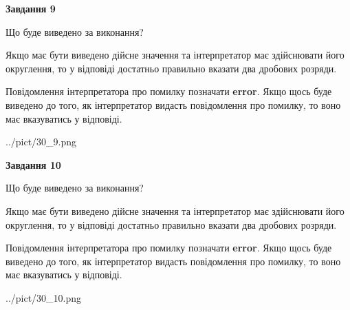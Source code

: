 \documentclass[12pt, ukrainian]{article}
\begin{document}
{\begin {Large}
{\begin {center}\textbf{Завдання 9}\end {center}}\par
Що буде виведено за виконання? \par

Якщо має бути виведено дійсне значення та інтерпретатор має здійснювати його округлення, 
то у відповіді достатньо правильно вказати два дробових розряди.

Повідомлення інтерпретатора про помилку позначати \textbf{error}.
Якщо щось буде виведено до того, як інтерпретатор видасть повідомлення про помилку, 
то воно має вказуватись у відповіді. \par

\begin{center}
	{../pict/30_9.png}
\end{center}
\newpage

{\begin {center}\textbf{Завдання 10}\end {center}}\par
Що буде виведено за виконання? \par

Якщо має бути виведено дійсне значення та інтерпретатор має здійснювати його округлення, 
то у відповіді достатньо правильно вказати два дробових розряди.

Повідомлення інтерпретатора про помилку позначати \textbf{error}.
Якщо щось буде виведено до того, як інтерпретатор видасть повідомлення про помилку, 
то воно має вказуватись у відповіді. \par

\begin{center}
	{../pict/30_10.png}
\end{center}
\newpage

\end {Large}}
\end{document}
